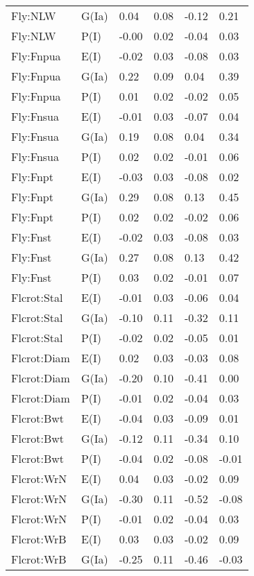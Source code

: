 \begin{center}
\begin{longtable}{|p{1.1in}|p{0.7in}|p{0.7in}|p{0.6in}|p{0.6in}|p{0.6in}|}
  Fly:NLW & G(Ia) & 0.04 & 0.08 & -0.12 & 0.21 \\ 
  Fly:NLW & P(I) & -0.00 & 0.02 & -0.04 & 0.03 \\ 
  Fly:Fnpua & E(I) & -0.02 & 0.03 & -0.08 & 0.03 \\ 
  Fly:Fnpua & G(Ia) & 0.22 & 0.09 & 0.04 & 0.39 \\ 
  Fly:Fnpua & P(I) & 0.01 & 0.02 & -0.02 & 0.05 \\ 
  Fly:Fnsua & E(I) & -0.01 & 0.03 & -0.07 & 0.04 \\ 
  Fly:Fnsua & G(Ia) & 0.19 & 0.08 & 0.04 & 0.34 \\ 
  Fly:Fnsua & P(I) & 0.02 & 0.02 & -0.01 & 0.06 \\ 
  Fly:Fnpt & E(I) & -0.03 & 0.03 & -0.08 & 0.02 \\ 
  Fly:Fnpt & G(Ia) & 0.29 & 0.08 & 0.13 & 0.45 \\ 
  Fly:Fnpt & P(I) & 0.02 & 0.02 & -0.02 & 0.06 \\ 
  Fly:Fnst & E(I) & -0.02 & 0.03 & -0.08 & 0.03 \\ 
  Fly:Fnst & G(Ia) & 0.27 & 0.08 & 0.13 & 0.42 \\ 
  Fly:Fnst & P(I) & 0.03 & 0.02 & -0.01 & 0.07 \\ 
  Flcrot:Stal & E(I) & -0.01 & 0.03 & -0.06 & 0.04 \\ 
  Flcrot:Stal & G(Ia) & -0.10 & 0.11 & -0.32 & 0.11 \\ 
  Flcrot:Stal & P(I) & -0.02 & 0.02 & -0.05 & 0.01 \\ 
  Flcrot:Diam & E(I) & 0.02 & 0.03 & -0.03 & 0.08 \\ 
  Flcrot:Diam & G(Ia) & -0.20 & 0.10 & -0.41 & 0.00 \\ 
  Flcrot:Diam & P(I) & -0.01 & 0.02 & -0.04 & 0.03 \\ 
  Flcrot:Bwt & E(I) & -0.04 & 0.03 & -0.09 & 0.01 \\ 
  Flcrot:Bwt & G(Ia) & -0.12 & 0.11 & -0.34 & 0.10 \\ 
  Flcrot:Bwt & P(I) & -0.04 & 0.02 & -0.08 & -0.01 \\ 
  Flcrot:WrN & E(I) & 0.04 & 0.03 & -0.02 & 0.09 \\ 
  Flcrot:WrN & G(Ia) & -0.30 & 0.11 & -0.52 & -0.08 \\ 
  Flcrot:WrN & P(I) & -0.01 & 0.02 & -0.04 & 0.03 \\ 
  Flcrot:WrB & E(I) & 0.03 & 0.03 & -0.02 & 0.09 \\ 
  Flcrot:WrB & G(Ia) & -0.25 & 0.11 & -0.46 & -0.03 \\ 

\end{longtable}
\end{center}
